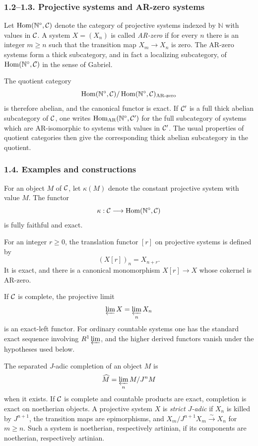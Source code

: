 \documentclass[11pt]{article}
\theoremstyle{plain}
\theoremstyle{definition}
\theoremstyle{remark}
\newcommand{\bN}{\mathbb N}
\DeclareMathOperator{\Hom}{Hom}
\newcommand{\AR}{\mathrm{AR}}
\begin{document}
\subsubsection*{1.2--1.3. Projective systems and AR-zero systems}

Let $\Hom(\bN^\circ,\cC)$ denote the category of projective systems indexed by
$\bN$ with values in $\mathcal C$. A system $X=(X_n)$ is called \emph{AR-zero} if for every
$n$ there is an integer $m\ge n$ such that the transition map
$X_m\to X_n$ is zero. The AR-zero systems form a thick subcategory, and in fact a
localizing subcategory, of $\Hom(\bN^\circ,\cC)$ in the sense of Gabriel.

The quotient category
\[
     \Hom(\bN^\circ,\cC)/\Hom(\bN^\circ,\cC)_{\AR\text{-zero}}
\]
is therefore abelian, and the canonical functor is exact. If $\mathcal C'$ is a full thick
abelian subcategory of $\mathcal C$, one writes
$\Hom_{\AR}(\bN^\circ,\cC')$ for the full subcategory of systems which are
AR-isomorphic to systems with values in $\mathcal C'$. The usual properties of quotient
categories then give the corresponding thick abelian subcategory in the quotient.

\subsubsection*{1.4. Examples and constructions}

For an object $M$ of $\mathcal C$, let $\kappa(M)$ denote the constant projective system
with value $M$. The functor
\[
       \kappa:\cC\longrightarrow \Hom(\bN^\circ,\cC)
\]
is fully faithful and exact.

For an integer $r\ge0$, the translation functor $[r]$ on projective systems is
defined by
\[
      (X[r])_n=X_{n+r}.
\]
It is exact, and there is a canonical monomorphism $X[r]\to X$ whose cokernel is
AR-zero.

If $\mathcal C$ is complete, the projective limit
\[
      \varprojlim X=\varprojlim_n X_n
\]
is an exact-left functor. For ordinary countable systems one has the standard exact
sequence involving $R^1\varprojlim$, and the higher derived functors vanish under
the hypotheses used below.

The separated $J$-adic completion of an object $M$ is
\[
      \widehat M=\varprojlim_n M/J^nM
\]
when it exists. If $\mathcal C$ is complete and countable products are exact, completion is
exact on noetherian objects. A projective system $X$ is \emph{strict $J$-adic} if
$X_n$ is killed by $J^{n+1}$, the transition maps are epimorphisms, and
$X_m/J^{n+1}X_m\xrightarrow{\sim}X_n$ for $m\ge n$. Such a system is noetherian,
respectively artinian, if its components are noetherian, respectively artinian.
\end{document}
